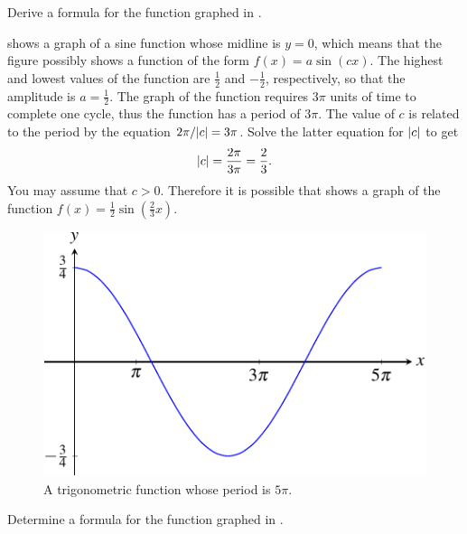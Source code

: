 \documentclass[a4paper,oneside,12pt]{article}
\begin{document}
\begin{example}
Derive a formula for the function graphed in
.
\end{example}

\begin{solution}
 shows a graph of a sine
function whose midline is $y = 0$, which means that the figure
possibly shows a function of the form $f(x) = a \sin(cx)$.  The
highest and lowest values of the function are $\frac{1}{2}$ and
$-\frac{1}{2}$, respectively, so that the amplitude is
$a = \frac{1}{2}$.  The graph of the function requires $3\pi$ units of
time to complete one cycle, thus the function has a period of $3\pi$.
The value of $c$ is related to the period by the equation
$2\pi / \lvert c\rvert = 3\pi$.  Solve the latter equation for
$\lvert c\rvert$ to get
\[
\lvert c\rvert
=
\frac{2\pi}{3\pi}
=
\frac{2}{3}.
\]
You may assume that $c > 0$.  Therefore it is possible that
 shows a graph of the function
$f(x) = \frac{1}{2} \sin(\frac{2}{3} x)$.
\end{solution}

\begin{figure}[!htbp]
\centering
\includegraphics[scale=1.1]{image/13/3quarter-cos-5pi.pdf}
\caption{%
  A trigonometric function whose period is $5\pi$.
}
\label{fig:trigonometric:3quarter_cos_5pi}
\end{figure}

\begin{exercise}
Determine a formula for the function graphed in
.
\end{exercise}
\end{document}
